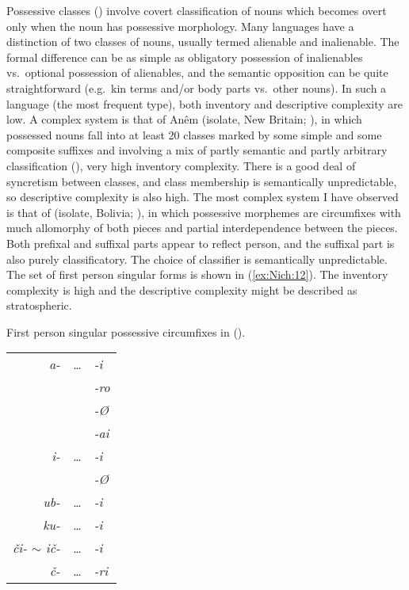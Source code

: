 \documentclass[output=collectionpaper]{langsci/langscibook}
\begin{document}
Possessive classes (\citealt{Nichols2013,Bickel2013a}) involve covert classification of nouns which becomes overt only when the noun has possessive morphology. Many languages have a distinction of two classes of nouns, usually termed alienable and inalienable. The formal difference can be as simple as obligatory possession of inalienables vs.\ optional possession of alienables, and the semantic opposition can be quite straightforward (e.g.\ kin terms and/or body parts vs.\ other nouns). In such a language (the most frequent type), both inventory and descriptive complexity are low. A complex system is that of Anêm (isolate, New Britain; \citealt{Thurston1982}), in which possessed nouns fall into at least 20 classes marked by some simple and some composite suffixes and involving a mix of partly semantic and partly arbitrary classification (\citealt[37--38]{Thurston1982}), very high inventory complexity. There is a good deal of syncretism between classes, and class membership is semantically unpredictable, so descriptive complexity is also high. The most complex system I have observed is that of  (isolate, Bolivia; \citealt{Key1967}), in which possessive morphemes are circumfixes with much allomorphy of both pieces and partial interdependence between the pieces. Both prefixal and suffixal parts appear to reflect person, and the suffixal part is also purely classificatory. The choice of classifier is semantically unpredictable. The set of first person singular forms is shown in (\ref{ex:Nich:12}). The inventory complexity is high and the descriptive complexity might be described as stratospheric.

\ea
\label{ex:Nich:12}
First person singular possessive circumfixes in  (\citealt{Key1967}). \\
\medskip
\begin{tabular}{>{\itshape}r>{\itshape}l>{\itshape}l}
		a- & \ldots &	-i \\
			& & -ro \\
			& & -Ø	 \\
			 && -ai	 \\
		i-  & \ldots & 	-i	 \\
			 && -Ø	 \\
		ub-  & \ldots &	-i \\
		ku-  & \ldots & 	-i \\
		či- $\sim$ ič- & \ldots & -i		 \\
		č- & \ldots &	-ri	 \\
\end{tabular}
\z
\end{document}
